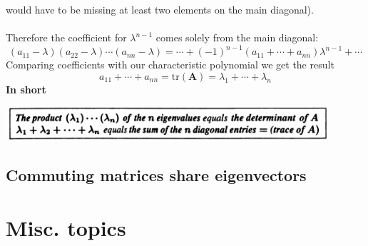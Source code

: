 \documentclass{report}
\begin{document}
would have to be missing at least two elements on the main diagonal).\\
\vspace{1mm}\\
Therefore the coefficient for $\lambda^{n-1}$ comes solely from the main diagonal:
\begin{equation*}
(a_{11}-\lambda)(a_{22}-\lambda)\cdots(a_{nn}-\lambda)=\cdots+(-1)^{n-1}(a_{11}+\cdots+a_{nn})\lambda^{n-1}+\cdots
\end{equation*}
Comparing coefficients with our characteristic polynomial we get the result
\begin{equation*}
a_{11}+\cdots+a_{nn}=\text{tr}(\bm A)=\lambda_1+\cdots+\lambda_n
\end{equation*}
\textbf{In short}
\begin{center}
\includegraphics[width=12cm]{113}
\end{center}
\newpage

\section{Commuting matrices share eigenvectors}








\newpage



\appendix
\chapter{Misc. topics}
\end{document}

